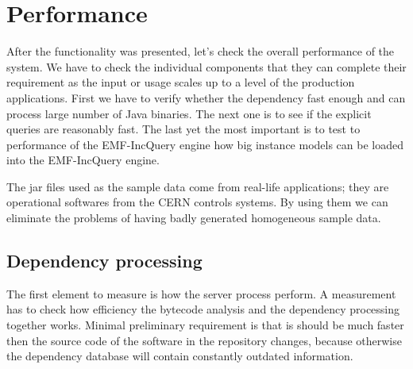 \section{Performance}
After the functionality was presented, let's check the overall performance of
the system. We have to check the individual components  that they can complete
their requirement as the input or usage scales up to a level of the production
applications. First we have to verify whether the dependency fast enough and can
process large number of Java binaries. The next one is to see if the explicit
queries are reasonably fast. The last yet the most important is to test to
performance of the EMF-IncQuery engine how big instance models can be loaded
into the EMF-IncQuery engine.

The jar files used as the sample data come from real-life applications; they are
operational softwares from the CERN controls systems. By using them we can
eliminate the problems of having badly generated homogeneous sample data.

\subsection{Dependency processing}
\label{sect:depproc}
The first element to measure is how the server process perform.
A measurement has to check how efficiency the bytecode analysis and the
dependency processing together works. Minimal preliminary requirement is that is
should be much faster then the source code of the software in  the repository
changes, because otherwise the dependency database will contain constantly
outdated information.

